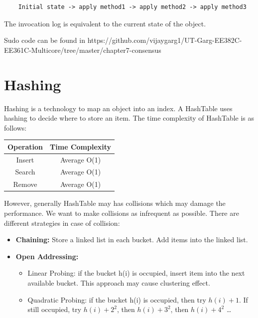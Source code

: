 \documentclass[twoside]{article}
\begin{document}
\begin{center}
    \begin{lstlisting}
    Initial state -> apply method1 -> apply method2 -> apply method3
    \end{lstlisting}
\end{center}

The invocation log is equivalent to the current state of the object.

Sudo code can be found in https://github.com/vijaygarg1/UT-Garg-EE382C-EE361C-Multicore/tree/master/chapter7-consensus

\section{Hashing}

Hashing is a technology to map an object into an index. A HashTable uses hashing to decide where to store an item. The time complexity of HashTable is as follows:

\begin{center}
    \begin{tabular}{| c | c |}
    \hline
    \textbf{Operation} & \textbf{Time Complexity} \\ \hline
    Insert & Average O(1) \\ \hline
    Search & Average O(1)  \\ \hline
    Remove & Average O(1)  \\
    \hline
    \end{tabular}
\end{center}

However, generally HashTable may has collisions which may damage the performance. We want to make collisions as infrequent as possible. There are different strategies in case of collision:

\begin{itemize}
    \item \textbf{Chaining:} Store a linked list in each bucket. Add items into the linked list.
    \item \textbf{Open Addressing:}
        \begin{itemize}
            \item Linear Probing: if the bucket h(i) is occupied, insert item into the next available bucket. This approach may cause clustering effect.
            \item Quadratic Probing: if the bucket h(i) is occupied, then try \begin{math}h(i) + 1\end{math}. If still occupied, try \begin{math}h(i) + 2^2\end{math}, then \begin{math}h(i) + 3^2\end{math}, then \begin{math}h(i) + 4^2\end{math} \ldots
        \end{itemize}
\end{itemize}
\end{document}
